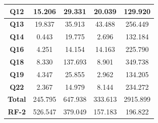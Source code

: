 \begin{table}[t]
\begin{tabular}{|c|c|c|c|c|}
                 \textbf{Q12}         & 15.206            & 29.331                        & 20.039            & 129.920                   \\ 
                \hline
                 \textbf{Q13}         & 19.837            & 35.913                        & 43.488            & 256.449                   \\ 
                \hline
                 \textbf{Q14}         & 0.443             & 19.775                        & 2.696             & 132.184                   \\ 
                \hline
                 \textbf{Q16}         & 4.251             & 14.154                        & 14.163            & 225.790                   \\ 
                \hline
                 \textbf{Q18}         & 8.330             & 137.693                       & 8.901             & 349.738                   \\ 
                \hline
                 \textbf{Q19}         & 4.347             & 25.855                        & 2.962             & 134.205                   \\ 
                \hline
                 \textbf{Q22}         & 2.367             & 14.979                        & 8.144             & 234.272                   \\ 
                \hline
                 \textbf{Total}       & 245.795           & 647.938                       & 333.613           & 2915.899                  \\ 
                \hline
                 \textbf{RF-2}        & 526.547           & 379.049                       & 157.183           & 196.822                   \\
                \hline
                \end{tabular}
                \end{table}

